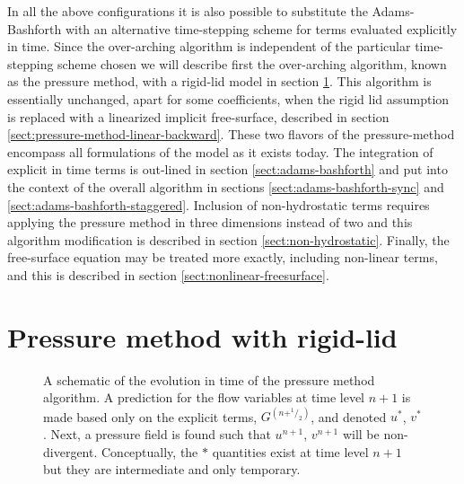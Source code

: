 In all the above configurations it is also possible to substitute the
Adams-Bashforth with an alternative time-stepping scheme for terms
evaluated explicitly in time. Since the over-arching algorithm is
independent of the particular time-stepping scheme chosen we will
describe first the over-arching algorithm, known as the pressure
method, with a rigid-lid model in section
\ref{sect:pressure-method-rigid-lid}. This algorithm is essentially
unchanged, apart for some coefficients, when the rigid lid assumption
is replaced with a linearized implicit free-surface, described in
section \ref{sect:pressure-method-linear-backward}. These two flavors
of the pressure-method encompass all formulations of the model as it
exists today. The integration of explicit in time terms is out-lined
in section \ref{sect:adams-bashforth} and put into the context of the
overall algorithm in sections \ref{sect:adams-bashforth-sync} and
\ref{sect:adams-bashforth-staggered}. Inclusion of non-hydrostatic
terms requires applying the pressure method in three dimensions
instead of two and this algorithm modification is described in section
\ref{sect:non-hydrostatic}. Finally, the free-surface equation may be
treated more exactly, including non-linear terms, and this is
described in section \ref{sect:nonlinear-freesurface}.


\section{Pressure method with rigid-lid} \label{sect:pressure-method-rigid-lid}

\begin{figure}
\begin{center}
\end{center}
\caption{
A schematic of the evolution in time of the pressure method
algorithm. A prediction for the flow variables at time level $n+1$ is
made based only on the explicit terms, $G^{(n+^1/_2)}$, and denoted
$u^*$, $v^*$. Next, a pressure field is found such that $u^{n+1}$,
$v^{n+1}$ will be non-divergent. Conceptually, the $*$ quantities
exist at time level $n+1$ but they are intermediate and only
temporary.}
\label{fig:pressure-method-rigid-lid}
\end{figure}

